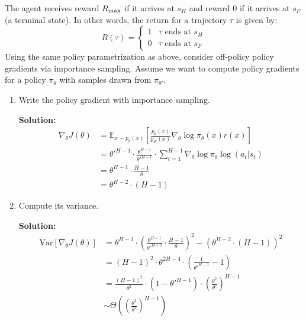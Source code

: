 \documentclass{article}
\begin{document}
\begin{enumerate}
The agent receives reward $R_{\textrm{max}}$ if it arrives at $s_H$ and reward $0$ if it arrives at $s_F$ (a terminal state). In other words, the return for a trajectory $\tau$ is given by:
\[R(\tau) = \begin{cases}1 & \tau \textrm{ ends at } s_H \\ 0 & \tau \textrm{ ends at } s_F \end{cases}\]
Using the same policy parametrization as above, consider off-policy policy gradients via importance sampling. Assume we want to compute policy gradients for a policy $\pi_\theta$ with samples drawn from $\pi_{\theta'}$.
\begin{enumerate}
    \item Write the policy gradient with importance sampling.
    
    \textbf{Solution:}
    $$
    \begin{aligned}
    \nabla_{\theta} J(\theta)
    &= \mathbb{E}_{x \sim p_{\theta}(x)} \left[ \frac{p_{\theta}(x)}{p_{\theta'}(x)} \nabla_{\theta} \log \pi_{\theta}(x) r(x) \right] \\
    &= \theta'^{H-1} \cdot \frac{\theta^{H-1}}{\theta'^{H-1}} \cdot \sum_{t=1}^{H-1} \nabla_{\theta} \log \pi_{\theta} \log (a_t | s_t) \\
    &= \theta^{H-1} \cdot \frac{H-1}{\theta} \\
    &= \theta^{H-2} \cdot (H-1)
    \end{aligned}
    $$

    \item Compute its variance.

    
    \textbf{Solution:}
    $$
    \begin{aligned}
    \text{Var} \left[ \nabla_{\theta} J(\theta) \right] &= \theta^{H-1} \cdot \left( \frac{\theta^{H-1}}{\theta'^{H-1}} \cdot \frac{H-1}{\theta} \right)^2 - \left( \theta^{H-2} \cdot (H-1) \right)^2 \\
    &= (H-1)^2 \cdot \theta^{2H-4} \cdot \left( \frac{1}{\theta'^{H-1}} - 1 \right) \\
    &= \frac{(H-1)^2}{\theta^2} \cdot (1 - \theta'^{H-1}) \cdot \left( \frac{\theta^2}{\theta'} \right)^{H-1} \\
    &\sim \Theta \left( \left( \frac{\theta^2}{\theta'} \right)^{H-1} \right)
    \end{aligned}
    $$

\end{enumerate}
\end{enumerate}
\end{document}
